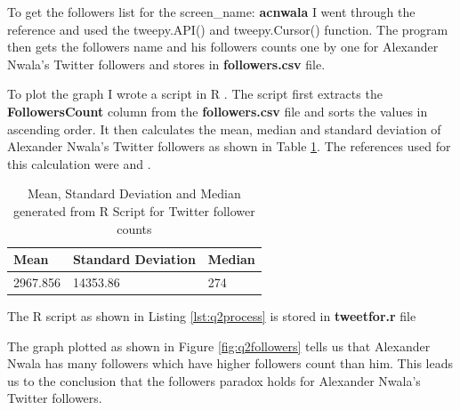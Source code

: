 \documentclass[letterpaper,11pt]{article}
\begin{document}
To get the followers list for the screen\_name: \textbf{acnwala} I went through the reference \cite{apiref} and used the tweepy.API() and  tweepy.Cursor() function. The program then gets the followers name and his followers counts one by one for Alexander Nwala’s Twitter followers and stores in \textbf{followers.csv} file.



To plot the graph I wrote a script in R \cite{rdocref}. The script first extracts the  \textbf{FollowersCount} column from the\textbf{ followers.csv} file and sorts the values in ascending order. It then calculates the mean, median and standard deviation of Alexander Nwala’s Twitter followers as shown in Table \ref{table:q2summary}. The references used for this calculation were \cite{sortref} and \cite{statref}. 


\begin{table}[htb]
\centering
\begin{tabular}{ | l | l | l |}
\hline
\textbf{Mean} & \textbf{Standard Deviation} & \textbf{Median} \\
\hline
2967.856 & 14353.86 & 274 \\
\hline
\end{tabular}
\caption{Mean, Standard Deviation and Median generated from R Script for Twitter follower counts}
\label{table:q2summary}
\end{table}

The R script as shown in Listing \ref{lst:q2process}  is stored in \textbf{tweetfor.r} file 




The graph plotted as shown in Figure \ref{fig:q2followers} tells us that Alexander Nwala has many followers which have higher followers count than him. This leads us to the conclusion that the followers paradox holds for Alexander Nwala’s Twitter followers.
\end{document}
